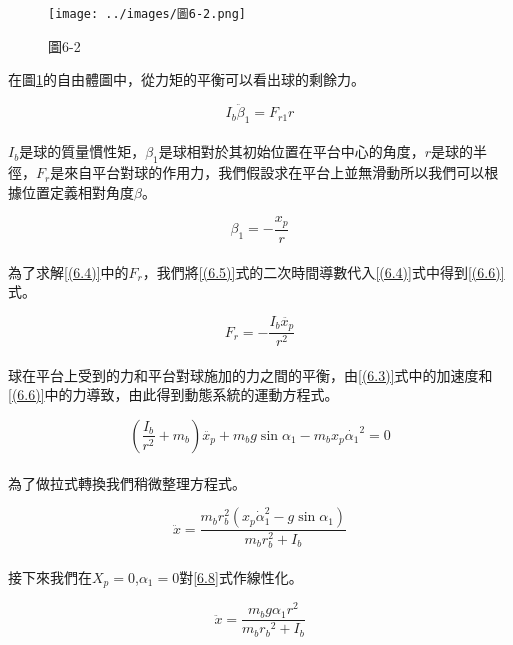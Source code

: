 \begin{figure}[h]
\centering
\texttt{[image: ../images/圖6-2.png]}
\caption{圖6-2}
\label{fig:6-2}
\end{figure}

在圖\ref{fig:6-2}的自由體圖中，從力矩的平衡可以看出球的剩餘力。

\begin{equation}
I_b \ddot{\beta}_1=F_{r1} r
\label{(6.4)}
\end{equation} \\

\(I_b\)是球的質量慣性矩，\(\beta_1\)是球相對於其初始位置在平台中心的角度，\(r\)是球的半徑，\(F_r\)是來自平台對球的作用力，我們假設求在平台上並無滑動所以我們可以根據位置定義相對角度\(\beta\)。

\begin{equation}
\beta_1=-\frac{x_p}{r}
\label{(6.5)}
\end{equation} \\

為了求解\ref{(6.4)}中的\(F_r\)，我們將\ref{(6.5)}式的二次時間導數代入\ref{(6.4)}式中得到\ref{(6.6)}式。

\begin{equation}
F_r=-\frac{I_b \ddot{x_p}}{r^2}
\label{(6.6)}
\end{equation} \\

球在平台上受到的力和平台對球施加的力之間的平衡，由\ref{(6.3)}式中的加速度和\ref{(6.6)}中的力導致，由此得到動態系統的運動方程式。

\begin{equation}
\left(\frac{I_b}{r^2}+m_b\right) \ddot{x_p}+m_b g \sin \alpha_1-m_b x_p{\dot{\alpha_1}}^2=0
\label{(6.7)}
\end{equation} \\

為了做拉式轉換我們稍微整理方程式。

\begin{equation}
\ddot{x}=\frac{m_b r_b^2\left(x_p \dot{\alpha}_1^2-g \sin \alpha_1\right)}{m_b r_b^2+I_b}
\label{(6.8)}
\end{equation} \\

接下來我們在\(X_p=0\),\(\alpha_1=0\)對\ref{6.8}式作線性化。

\begin{equation}
\ddot{x}=\frac{m_b g \alpha_1 r^2}{m_b r_b{ }^2+I_b}
\label{(6.9)}
\end{equation}\\

